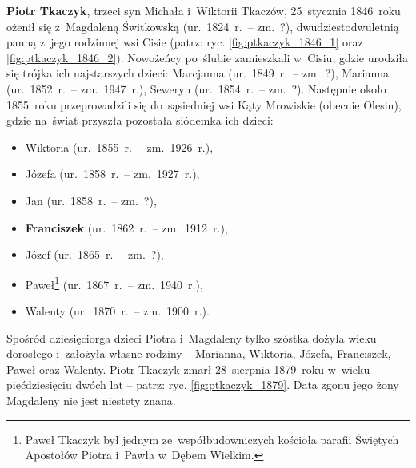 \textbf{Piotr Tkaczyk}, trzeci
syn Michała
i~Wiktorii
Tkaczów, 25~stycznia 1846~roku ożenił się z~Magdaleną
Świtkowską
(ur.~1824~r.~-- zm.~?), dwudziestodwuletnią panną z~jego rodzinnej wsi
Cisie (patrz: ryc. \ref{fig:ptkaczyk_1846_1} oraz \ref{fig:ptkaczyk_1846_2}).
Nowożeńcy po~ślubie zamieszkali w~Cisiu, gdzie urodziła się trójka ich
najstarszych dzieci: Marcjanna
(ur.~1849~r.~-- zm.~?), Marianna
(ur.~1852~r.~-- zm.~1947~r.), Seweryn
(ur.~1854~r.~-- zm.~?). Następnie około 1855~roku przeprowadzili się
do~sąsiedniej wsi Kąty Mrowiskie (obecnie Olesin), gdzie na~świat przyszła
pozostała siódemka ich dzieci:

\begin{itemize}
\item Wiktoria
(ur.~1855~r.~-- zm.~1926~r.),
\item Józefa
(ur.~1858~r.~-- zm.~1927~r.),
\item Jan
(ur.~1858~r.~-- zm.~?),
\item \textbf{Franciszek}
(ur.~1862~r.~-- zm.~1912~r.),
\item Józef
(ur.~1865~r.~-- zm.~?),
\item Paweł\footnote{Paweł Tkaczyk
był jednym ze~współbudowniczych kościoła parafii Świętych Apostołów Piotra
i~Pawła w~Dębem Wielkim.} (ur.~1867~r.~-- zm.~1940~r.),
\item Walenty
(ur.~1870~r.~-- zm.~1900~r.).
\end{itemize}

Spośród dziesięciorga dzieci Piotra
i~Magdaleny tylko
szóstka dożyła wieku dorosłego i~założyła własne rodziny -- Marianna, Wiktoria,
Józefa, Franciszek, Paweł oraz Walenty. Piotr Tkaczyk zmarł 28~sierpnia
1879~roku w~wieku pięćdziesięciu dwóch lat -- patrz: ryc.
\ref{fig:ptkaczyk_1879}. Data zgonu jego żony Magdaleny nie jest niestety
znana.

